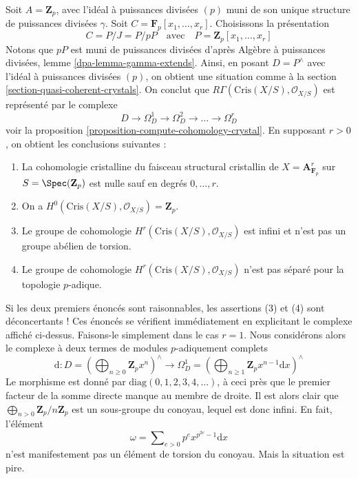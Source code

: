 \begin{example}
\label{example-affine-n-space}
Soit $A = \mathbf{Z}_p$, avec l'idéal à puissances divisées $(p)$ muni de
son unique structure de puissances divisées $\gamma$. Soit
$C = \mathbf{F}_p[x_1, \ldots, x_r]$. Choisissons la présentation
$$
C = P/J = P/pP\quad\text{avec}\quad P = \mathbf{Z}_p[x_1, \ldots, x_r]
$$
Notons que $pP$ est muni de puissances divisées d'après
Algèbre à puissances divisées, lemme \ref{dpa-lemma-gamma-extends}.
Ainsi, en posant $D = P^\wedge$ avec l'idéal à puissances divisées $(p)$, on obtient une
situation comme à la section \ref{section-quasi-coherent-crystals}.
On conclut que $R\Gamma(\text{Cris}(X/S), \mathcal{O}_{X/S})$
est représenté par le complexe
$$
D \to \Omega^1_D \to \Omega^2_D \to \ldots \to \Omega^r_D
$$
voir la proposition \ref{proposition-compute-cohomology-crystal}.
En supposant $r > 0$, on obtient les conclusions suivantes :
\begin{enumerate}
\item La cohomologie cristalline du faisceau structural cristallin
de $X = \mathbf{A}^r_{\mathbf{F}_p}$ sur $S = \Spec(\mathbf{Z}_p)$
est nulle sauf en degrés $0, \ldots, r$.
\item On a $H^0(\text{Cris}(X/S), \mathcal{O}_{X/S}) = \mathbf{Z}_p$.
\item Le groupe de cohomologie $H^r(\text{Cris}(X/S), \mathcal{O}_{X/S})$
est infini et n'est pas un groupe abélien de torsion.
\item Le groupe de cohomologie $H^r(\text{Cris}(X/S), \mathcal{O}_{X/S})$
n'est pas séparé pour la topologie $p$-adique.
\end{enumerate}
Si les deux premiers énoncés sont raisonnables, les assertions (3) et (4) sont
déconcertants ! Ces énoncés se vérifient immédiatement en
explicitant le complexe affiché ci-dessus. Faisons-le simplement
dans le cas $r = 1$. Nous considérons alors le complexe à deux termes
de modules $p$-adiquement complets
$$
\text{d} :
D = \left(
\bigoplus\nolimits_{n \geq 0} \mathbf{Z}_p x^n
\right)^\wedge
\longrightarrow
\Omega^1_D = \left(
\bigoplus\nolimits_{n \geq 1} \mathbf{Z}_p x^{n - 1}\text{d}x
\right)^\wedge
$$
Le morphisme est donné par $\text{diag}(0, 1, 2, 3, 4, \ldots)$, à ceci près que
le premier facteur de la somme directe manque au membre de droite. Il est alors clair
que $\bigoplus_{n > 0} \mathbf{Z}_p/n\mathbf{Z}_p$ est un sous-groupe
du conoyau, lequel est donc infini. En fait, l'élément
$$
\omega = \sum\nolimits_{e > 0} p^e x^{p^{2e} - 1}\text{d}x
$$
n'est manifestement pas un élément de torsion du conoyau. Mais la situation est pire.

\end{example}
